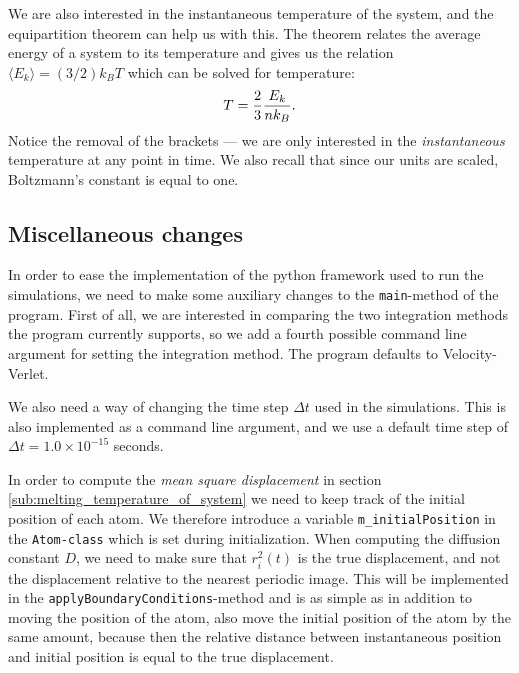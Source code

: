 \documentclass[a4paper]{article}
\begin{document}
    We are also interested in the instantaneous temperature of the system, and
    the equipartition theorem \cite{equipar} can help us with this. The theorem
    relates the average energy of a system to its temperature and gives us the
    relation $\langle E_k \rangle = (3/2)k_BT$ which can be solved for
    temperature:
    \begin{equation}
        \notag
        T = \frac{2}{3} \frac{E_k}{nk_B}.
    \end{equation}
    Notice the removal of the brackets --- we are only interested in the
    \emph{instantaneous} temperature at any point in time. We also recall that
    since our units are scaled, Boltzmann's constant is equal to one.
    
    \subsection{Miscellaneous changes}
    \label{sub:miscellaneous_changes}
    
    In order to ease the implementation of the python framework used to run the
    simulations, we need to make some auxiliary changes to the
    \texttt{main}-method of the program. First of all, we are interested in
    comparing the two integration methods the program currently supports, so we
    add a fourth possible command line argument for setting the integration
    method. The program defaults to Velocity-Verlet.  
    
    We also need a way of changing the time step $\Delta t$ used in the
    simulations. This is also implemented as a command line argument, and we
    use a default time step of $\Delta t = 1.0 \times 10^{-15}$ seconds.
    
    In order to compute the \emph{mean square displacement} in section
    \ref{sub:melting_temperature_of_system} we need to keep track of the
    initial position of each atom. We therefore introduce a variable
    \texttt{m\_initialPosition} in the \texttt{Atom-class} which is set during
    initialization.  When computing the diffusion constant $D$, we need to make
    sure that $r_i^2(t)$ is the true displacement, and not the displacement
    relative to the nearest periodic image. This will be implemented in the
    \texttt{applyBoundaryConditions}-method and is as simple as in addition to
    moving the position of the atom, also move the initial position of the atom
    by the same amount, because then the relative distance between instantaneous
    position and initial position is equal to the true displacement.
\end{document}
